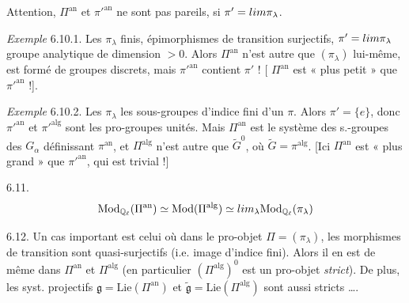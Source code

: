 \documentclass[11pt,a4paper]{article}
\begin{document}
Attention, $\Pi^{\mathrm{an}}$ et \struck{\ill{}} $\pi'^{\mathrm{an}}$ ne sont pas
pareils, si $\pi' = \varprojlim \pi_\lambda$.  

\emph{Exemple} 6.10.1. Les $\pi_\lambda$ finis, épimorphismes de transition
surjectifs, $\pi' = \varprojlim \pi_\lambda$ groupe analytique de dimension $> 0$.
Alors $\Pi^{\mathrm{an}}$ n'est autre que $(\pi_\lambda)$ lui-même, est formé de
groupes discrets, mais $\pi'^{\mathrm{an}}$ contient 
$\pi'$ ! [ $\Pi^{\mathrm{an}}$  est « plus petit »
que $\pi'^{\mathrm{an}}$ !].

\emph{Exemple} 6.10.2. Les $\pi_\lambda$ les sous-groupes d'indice fini d'un $\pi$.
Alors $\pi' = \{e\}$, donc $\pi'^{\mathrm{an}}$ et $\pi'^{\mathrm{alg}}$ sont les
pro-groupes unités. Mais $\Pi^{\mathrm{an}}$ est le système des s.-groupes
  des
$G_\alpha$ définissant $\pi^{\mathrm{an}}$, et $\Pi^{\mathrm{alg}}$ n'est autre que
$\widetilde{G}^{0}$, où $\widetilde{G} = \pi^{\mathrm{alg}}$.  [Ici
$\Pi^{\mathrm{an}}$ est « plus grand » que $\pi'^{\mathrm{an}}$, qui est trivial !]

6.11.
\[
  \mathrm{Mod}_{\mathbb{Q}_\ell}(\Pi^{\mathrm{an}}) \simeq \mathrm{Mod}(\Pi^{\mathrm{alg}}) \simeq \varinjlim_\lambda \mathrm{Mod}_{\mathbb{Q}_\ell}(\pi_\lambda)
\]

6.12. Un cas important est celui où dans le  pro-objet
$\Pi = (\pi_\lambda)$, les morphismes de transition sont quasi-surjectifs (i.e.
image d'indice fini). Alors il en est de même dans $\Pi^{\mathrm{an}}$ et
$\Pi^{\mathrm{alg}}$ (en particulier $(\Pi^{\mathrm{alg}})^{0}$ est un pro-objet
\emph{strict}). De plus, les syst. projectifs $\mathfrak{g} = \mathrm{Lie}(\Pi^{\mathrm{an}})$
et $\widetilde{\mathfrak{g}} = \mathrm{Lie}(\Pi^{\mathrm{alg}})$ sont aussi stricts ….
\end{document}
